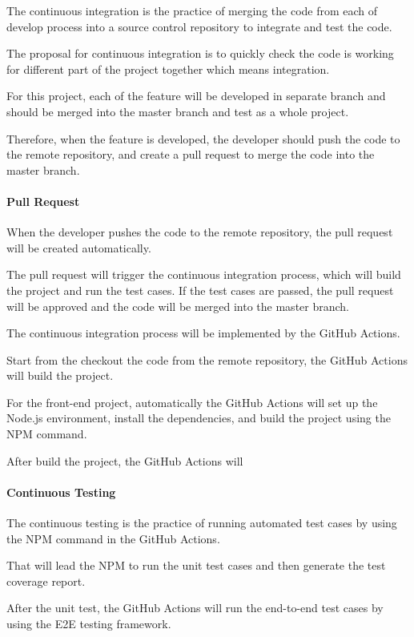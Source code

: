 The continuous integration is the practice of merging the code from each of develop process 
into a source control repository to integrate and test the code.

The proposal for continuous integration is to quickly check the code is working for different part
of the project together which means integration.

For this project, each of the feature will be developed in separate branch and should be merged into
the master branch and test as a whole project.

Therefore, when the feature is developed, the developer should push the code to the remote repository, 
and create a pull request to merge the code into the master branch.

\paragraph{Pull Request}

When the developer pushes the code to the remote repository, the pull request will be created automatically.

The pull request will trigger the continuous integration process, which will build the project and run the test cases.
If the test cases are passed, the pull request will be approved and the code will be merged into the master branch.

The continuous integration process will be implemented by the GitHub Actions.

Start from the checkout the code from the remote repository, 
the GitHub Actions will build the project.

For the front-end project, automatically the GitHub Actions will set up the Node.js environment,
install the dependencies, and build the project using the NPM command.

After build the project, the GitHub Actions will 

\paragraph{Continuous Testing}

The continuous testing is the practice of running automated test cases by using the   NPM command in the GitHub Actions.

That will lead the NPM to run the unit test cases and then generate the test coverage report.

After the unit test, the GitHub Actions will run the end-to-end test cases by using the E2E testing framework.
